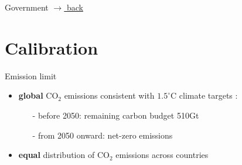 \documentclass[11pt,aspectratio=169]{beamer}
\begin{document}
\begin{frame}{ Government}
\hfill \hyperlink{backSchemeEnd}{\tiny{$\rightarrow$ back}}
\end{frame}



\section*{Calibration}
\begin{frame}{Emission limit}
	\hypertarget{emsall}{}
	\vspace{-1mm}
	\begin{itemize}
		\item  \textbf{global} CO$_2$ emissions consistent with $1.5^\circ$C climate targets \footnotesize{\citep{IPCC2022}}\normalsize :
		\vspace{1mm}
		\begin{itemize}
			\item[-] before 2050: remaining carbon budget 510Gt
			\item[-] from 2050 onward: net-zero  emissions
		\end{itemize}
		\vspace{0mm}
		\item \normalsize{\textbf{equal} distribution of  CO$_2$ emissions across countries }
	\end{itemize}
	\vspace{-2mm}
	

\end{frame}
\end{document}
